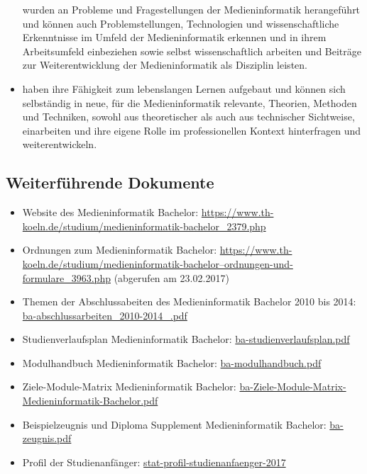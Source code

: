 \begin{itemize}
  wurden an Probleme und Fragestellungen der Medieninformatik
  herangeführt und können auch Problemstellungen, Technologien und
  wissenschaftliche Erkenntnisse im Umfeld der Medieninformatik erkennen
  und in ihrem Arbeitsumfeld einbeziehen sowie selbst wissenschaftlich
  arbeiten und Beiträge zur Weiterentwicklung der Medieninformatik als
  Disziplin leisten.
\item
  haben ihre Fähigkeit zum lebenslangen Lernen aufgebaut und können sich
  selbständig in neue, für die Medieninformatik relevante, Theorien,
  Methoden und Techniken, sowohl aus theoretischer als auch aus
  technischer Sichtweise, einarbeiten und ihre eigene Rolle im
  professionellen Kontext hinterfragen und weiterentwickeln.
\end{itemize}

\subsection{Weiterführende
Dokumente}\label{weiterfuxfchrende-dokumente}

\begin{itemize}
\tightlist
\item
  Website des Medieninformatik Bachelor:
  \url{https://www.th-koeln.de/studium/medieninformatik-bachelor\_2379.php}
\item
  Ordnungen zum Medieninformatik Bachelor:
  \href{https://www.th-koeln.de/studium/medieninformatik-bachelor--ordnungen-und-formulare_3963.php}{https://www.th-koeln.de/studium/medieninformatik-bachelor--ordnungen-und-formulare\_3963.php}
  (abgerufen am 23.02.2017)
\item
  Themen der Abschlussabeiten des Medieninformatik Bachelor 2010 bis
  2014:
  \href{../anhaenge/ba-abschlussarbeiten_2010-2014_.pdf}{ba-abschlussarbeiten\_2010-2014\_.pdf}
\item
  Studienverlaufsplan Medieninformatik Bachelor:
  \href{../anhaenge/ba-studienverlaufsplan.pdf}{ba-studienverlaufsplan.pdf}
\item
  Modulhandbuch Medieninformatik Bachelor:
  \href{../anhaenge/ba-modulhandbuch.pdf}{ba-modulhandbuch.pdf}
\item
  Ziele-Module-Matrix Medieninformatik Bachelor:
  \href{../anhaenge/ba-Ziele-Module-Matrix-Medieninformatik-Bachelor.pdf}{ba-Ziele-Module-Matrix-Medieninformatik-Bachelor.pdf}
\item
  Beispielzeugnis und Diploma Supplement Medieninformatik Bachelor:
  \href{../anhaenge/ba-zeugnis.pdf}{ba-zeugnis.pdf}
\item
  Profil der Studienanfänger:
  \href{../anhaenge/stat-profil-studienanfaenger-2017}{stat-profil-studienanfaenger-2017}
\end{itemize}

